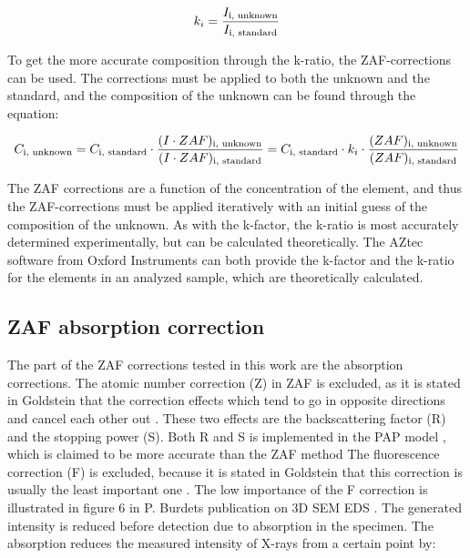 \begin{equation}
    \label{eq:theory:quantitative:k_ratio}
    k_i = \frac{I_\textnormal{i, unknown}}{I_\textnormal{i, standard}}
\end{equation}


To get the more accurate composition through the k-ratio, the ZAF-corrections can be used.
The corrections must be applied to both the unknown and the standard, and the composition of the unknown can be found through the equation:

\begin{equation}
    \label{eq:theory:quantitative:k_ratio_ZAF}
    C_\textnormal{i, unknown} = C_\textnormal{i, standard} \cdot  \frac{(I \cdot ZAF)_\textnormal{i, unknown}}{(I \cdot ZAF)_\textnormal{i, standard}} = C_\textnormal{i, standard} \cdot k_i \cdot \frac{(ZAF)_\textnormal{i, unknown}}{(ZAF)_\textnormal{i, standard}}
\end{equation}

The ZAF corrections are a function of the concentration of the element, and thus the ZAF-corrections must be applied iteratively with an initial guess of the composition of the unknown.
As with the k-factor, the k-ratio is most accurately determined experimentally, but can be calculated theoretically.
The AZtec software from Oxford Instruments \cite{aztec_manual} can both provide the k-factor and the k-ratio for the elements in an analyzed sample, which are theoretically calculated.










\subsection{ZAF absorption correction}
\label{theory:quantitative:zaf}

The part of the ZAF corrections tested in this work are the absorption corrections.
The atomic number correction (Z) in ZAF is excluded, as it is stated in Goldstein that the correction effects which tend to go in opposite directions and cancel each other out \cite[p. 300]{goldstein_scanning_2018}.
These two effects are the backscattering factor (R) and the stopping power (S).
Both R and S is implemented in the PAP model \cite{pap_1991}, which is claimed to be more accurate than the ZAF method \cite{pap_1991,bastin_proza96_1998,goldstein_scanning_2018}
The fluorescence correction (F) is excluded, because it is stated in Goldstein that this correction is usually the least important one \cite[p. 307]{goldstein_scanning_2018}.
The low importance of the F correction is illustrated in figure 6 in P. Burdets publication on 3D SEM EDS \cite{burdet_2014_3dsem}.
The generated intensity is reduced before detection due to absorption in the specimen.
The absorption reduces the measured intensity of X-rays from a certain point by:

